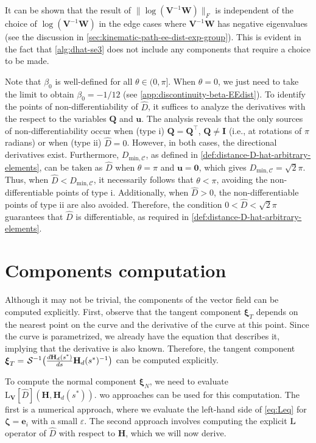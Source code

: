 It can be shown that the result of $\|\log(\mathbf{V}^{-1}\mathbf{W})\|_F$ is independent of the choice of $\log(\mathbf{V}^{-1}\mathbf{W})$ in the edge cases where $\mathbf{V}^{-1}\mathbf{W}$ has negative eigenvalues (see the discussion in \cref{sec:kinematic-path-ee-dist-exp-group}). This is evident in the fact that \cref{alg:dhat-se3} does not include any components that require a choice to be made.

Note that $\beta_0$ is well-defined for all $\theta \in (0,\pi]$. When $\theta=0$, we just need to take the limit to obtain $\beta_0=-1/12$ (see \cref{app:discontinuity-beta-EEdist}). To identify the points of non-differentiability of $\widehat{D}$, it suffices to analyze the derivatives with the respect to the variables $\mathbf{Q}$ and $\mathbf{u}$. The analysis reveals that the only sources of non-differentiability occur when (type i) $\mathbf{Q}=\mathbf{Q}^\top$, $\mathbf{Q} \not= \mathbf{I}$ (i.e., at rotations of $\pi$ radians) or when (type ii) $\widehat{D}=0$. However, in both cases, the directional derivatives exist. Furthermore, $D_{\text{min},\mathcal{C}}$, as defined in \cref{def:distance-D-hat-arbitrary-elements}, can be taken as $\widehat{D}$ when $\theta = \pi$  and $\mathbf{u} = \mathbf{0}$, which gives $D_{\text{min},\mathcal{C}} = \sqrt{2}\pi$. Thus, when $\widehat{D} < D_{\text{min},\mathcal{C}}$, it necessarily follows that $\theta < \pi$, avoiding the non-differentiable points of type i. Additionally, when $\widehat{D} > 0$, the non-differentiable points of type ii are also avoided. Therefore, the condition $0 < \widehat{D} < \sqrt{2}\pi$ guarantees that $\widehat{D}$ is differentiable, as required in \cref{def:distance-D-hat-arbitrary-elements}.
\section{Components computation}
Although it may not be trivial, the components of the vector field can be computed explicitly. First, observe that the tangent component $\boldsymbol{\xi}_T$ depends on the nearest point on the curve and the derivative of the curve at this point. Since the curve is parametrized, we already have the equation that describes it, implying that the derivative is also known. Therefore, the tangent component $\boldsymbol{\xi}_T = \invSL\bigl(\frac{d\mathbf{H}_d(s^*)}{ds}\mathbf{H}_d(s^*)^{-1}\bigr)$ can be computed explicitly.

To compute the normal component $\boldsymbol{\xi}_N$, we need to evaluate $\text{L}_{\mathbf{V}}[\widehat{D}](\mathbf{H}, \mathbf{H}_d(s^*))$. wo approaches can be used for this computation. The first is a numerical approach, where we evaluate the left-hand side of \eqref{eq:Leq} for $\boldsymbol{\zeta} = \mathbf{e}_i$ with a small $\varepsilon$. The second approach involves computing the explicit $\operatorname{L}$ operator of $\widehat{D}$ with respect to $\mathbf{H}$, which we will now derive.


